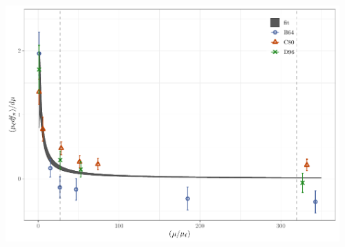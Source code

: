 \documentclass[xcolor={dvipsnames,table}]{beamer}
\begin{document}
\begin{frame}
  \begin{columns}
    \begin{column}{0.5\textwidth}
      \includegraphics[scale=0.5]{plots/der_fpi_fit.pdf}
    \end{column}
    \begin{column}{0.5\textwidth}
    \end{column}
  \end{columns}
\end{frame}
\end{document}
